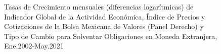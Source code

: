 \documentclass[
  a4paper,
]{article}
\begin{document}
\begin{figure}

\caption{\label{fig-fig5}Tasas de Crecimiento mensuales (diferencias
logarítmicas) de Indicador Global de la Actividad Económica, Índice de
Precios y Cotizaciones de la Bolsa Mexicana de Valores (Panel Derecho) y
Tipo de Cambio para Solventar Obligaciones en Moneda Extranjera,
Ene.2002-May.2021}\begin{minipage}[t]{\linewidth}

{\centering 


}

\end{minipage}%
\newline
\begin{minipage}[t]{\linewidth}

{\centering 

}
\end{minipage}
\end{figure}
\end{document}
